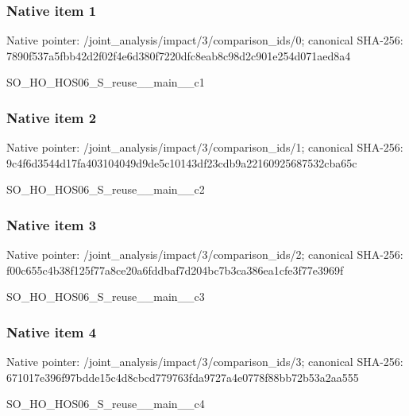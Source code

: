 \documentclass[10pt,a4paper]{article}
\begin{document}
\subsubsection{Native item 1}
Native pointer: /joint\_\allowbreak{}analysis/impact/3/comparison\_\allowbreak{}ids/0; canonical SHA-256: 7890f537a5fbb42d2f02f4e6d380f7220dfc8eab8c98d2c901e254d071aed8a4

\begingroup\raggedright\sloppy SO\_\allowbreak{}HO\_\allowbreak{}HOS06\_\allowbreak{}S\_\allowbreak{}reuse\_\allowbreak{}\_\allowbreak{}main\_\allowbreak{}\_\allowbreak{}c1\par\endgroup

\subsubsection{Native item 2}
Native pointer: /joint\_\allowbreak{}analysis/impact/3/comparison\_\allowbreak{}ids/1; canonical SHA-256: 9c4f6d3544d17fa403104049d9de5c10143df23cdb9a22160925687532cba65c

\begingroup\raggedright\sloppy SO\_\allowbreak{}HO\_\allowbreak{}HOS06\_\allowbreak{}S\_\allowbreak{}reuse\_\allowbreak{}\_\allowbreak{}main\_\allowbreak{}\_\allowbreak{}c2\par\endgroup

\subsubsection{Native item 3}
Native pointer: /joint\_\allowbreak{}analysis/impact/3/comparison\_\allowbreak{}ids/2; canonical SHA-256: f00c655c4b38f125f77a8ce20a6fddbaf7d204bc7b3ca386ea1cfe3f77e3969f

\begingroup\raggedright\sloppy SO\_\allowbreak{}HO\_\allowbreak{}HOS06\_\allowbreak{}S\_\allowbreak{}reuse\_\allowbreak{}\_\allowbreak{}main\_\allowbreak{}\_\allowbreak{}c3\par\endgroup

\subsubsection{Native item 4}
Native pointer: /joint\_\allowbreak{}analysis/impact/3/comparison\_\allowbreak{}ids/3; canonical SHA-256: 671017e396f97bdde15c4d8cbcd779763fda9727a4e0778f88bb72b53a2aa555

\begingroup\raggedright\sloppy SO\_\allowbreak{}HO\_\allowbreak{}HOS06\_\allowbreak{}S\_\allowbreak{}reuse\_\allowbreak{}\_\allowbreak{}main\_\allowbreak{}\_\allowbreak{}c4\par\endgroup
\end{document}
